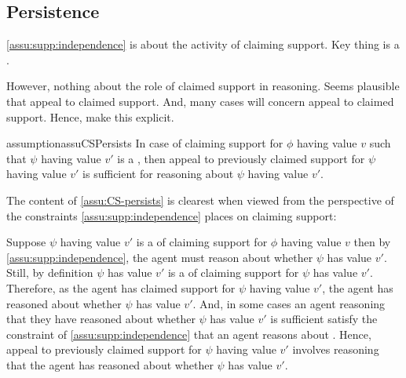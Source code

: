 \subsection{Persistence}
\label{sec:persistence}

\begin{note}
  \autoref{assu:supp:independence} is about the activity of claiming support.
  Key thing is a \requ{}.

  However, nothing about the role of claimed support in reasoning.
  Seems plausible that appeal to claimed support.
  And, many cases will concern appeal to claimed support.
  Hence, make this explicit.
\end{note}

\begin{note}[Assumption]
  \begin{restatable}{assumption}{assuCSPersists}
    \label{assu:CS-persists}
    In case of claiming support for \(\phi\) having value \(v\) such that \(\psi\) having value \(v'\) is a \requ{}, then appeal to previously claimed support for \(\psi\) having value \(v'\) is sufficient for reasoning about \(\psi\) having value \(v'\).
  \end{restatable}
\end{note}

\begin{note}[Intuition]
  The content of \autoref{assu:CS-persists} is clearest when viewed from the perspective of the constraints \autoref{assu:supp:independence} places on claiming support:

  Suppose \(\psi\) having value \(v'\) is a \requ{} of claiming support for \(\phi\) having value \(v\) then by \autoref{assu:supp:independence}, the agent must reason about whether \(\psi\) has value \(v'\).
  Still, by definition \(\psi\) has value \(v'\) is a \requ{} of claiming support for \(\psi\) has value \(v'\).
  Therefore, as the agent has claimed support for \(\psi\) having value \(v'\), the agent has reasoned about whether \(\psi\) has value \(v'\).
  And, in some cases an agent reasoning that they have reasoned about whether \(\psi\) has value \(v'\) is sufficient satisfy the constraint of \autoref{assu:supp:independence} that an agent reasons about .
  Hence, appeal to previously claimed support for \(\psi\) having value \(v'\) involves reasoning that the agent has reasoned about whether \(\psi\) has value \(v'\).
\end{note}

